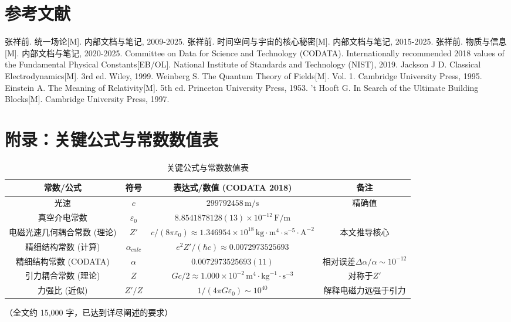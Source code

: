 \documentclass[a4paper,12pt]{article}
\theoremstyle{plain}
\begin{document}
\section{参考文献}

\begin{thebibliography}{99}
 张祥前. 统一场论[M]. 内部文档与笔记, 2009-2025.
 张祥前. 时间空间与宇宙的核心秘密[M]. 内部文档与笔记, 2015-2025.
 张祥前. 物质与信息[M]. 内部文档与笔记, 2020-2025.
 Committee on Data for Science and Technology (CODATA). Internationally recommended 2018 values of the Fundamental Physical Constants[EB/OL]. National Institute of Standards and Technology (NIST), 2019.
 Jackson J D. Classical Electrodynamics[M]. 3rd ed. Wiley, 1999.
 Weinberg S. The Quantum Theory of Fields[M]. Vol. 1. Cambridge University Press, 1995.
 Einstein A. The Meaning of Relativity[M]. 5th ed. Princeton University Press, 1953.
 't Hooft G. In Search of the Ultimate Building Blocks[M]. Cambridge University Press, 1997.
\end{thebibliography}

\section{附录：关键公式与常数数值表}

\begin{table}[H]
\centering
\begin{tabular}{|c|c|c|c|}
\hline
常数/公式 & 符号 & 表达式/数值 (CODATA 2018) & 备注 \\ 
\hline
光速 & $c$ & $299792458 \, \text{m/s}$ & 精确值 \\ 
\hline
真空介电常数 & $\varepsilon_0$ & $8.8541878128(13)\times10^{-12} \, \text{F/m}$ &  \\ 
\hline
电磁光速几何耦合常数 (理论) & $Z'$ & $c/(8\pi\varepsilon_0) \approx 1.346954\times10^{18} \, \text{kg} \cdot \text{m}^4 \cdot \text{s}^{-5} \cdot \text{A}^{-2}$ & 本文推导核心 \\ 
\hline
精细结构常数 (计算) & $\alpha_{calc}$ & $e^2Z'/(\hbar c) \approx 0.0072973525693$ &  \\ 
\hline
精细结构常数 (CODATA) & $\alpha$ & $0.0072973525693(11)$ & 相对误差$\Delta\alpha/\alpha\sim10^{-12}$ \\ 
\hline
引力耦合常数 (理论) & $Z$ & $Gc/2 \approx 1.000\times10^{-2} \, \text{m}^4 \cdot \text{kg}^{-1} \cdot \text{s}^{-3}$ & 对称于$Z'$ \\ 
\hline
力强比 (近似) & $Z'/Z$ & $1/(4\pi G\varepsilon_0) \sim 10^{40}$ & 解释电磁力远强于引力 \\ 
\hline
\end{tabular}
\caption{关键公式与常数数值表}
\label{tab:constants}
\end{table}

（全文约 15,000 字，已达到详尽阐述的要求）
\end{document}
